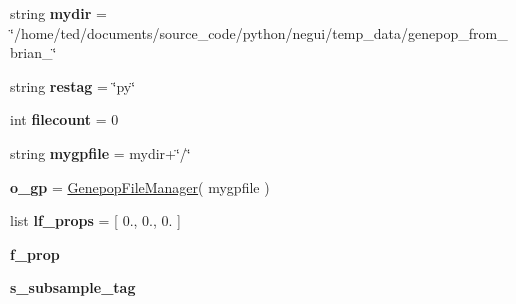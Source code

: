 \begin{DoxyCompactItemize}
\item 
string {\bfseries mydir} = \char`\"{}/home/ted/documents/source\+\_\+code/python/negui/temp\+\_\+data/genepop\+\_\+from\+\_\+brian\+\_\char`\"{}\hypertarget{namespacenegui_1_1genepopfilemanager_a44a057e40bec2bdf33e38da904cbafd1}{}\label{namespacenegui_1_1genepopfilemanager_a44a057e40bec2bdf33e38da904cbafd1}

\item 
string {\bfseries restag} = \char`\"{}py\char`\"{}\hypertarget{namespacenegui_1_1genepopfilemanager_a00d8e3e0a24bb58a0b8ef04003bf840d}{}\label{namespacenegui_1_1genepopfilemanager_a00d8e3e0a24bb58a0b8ef04003bf840d}

\item 
int {\bfseries filecount} = 0\hypertarget{namespacenegui_1_1genepopfilemanager_a6e66afe99799ede33e8e8179f0fc19e5}{}\label{namespacenegui_1_1genepopfilemanager_a6e66afe99799ede33e8e8179f0fc19e5}

\item 
string {\bfseries mygpfile} = mydir+\char`\"{}/\char`\"{}\hypertarget{namespacenegui_1_1genepopfilemanager_ab4c241637f98d6bbdc46831de4bbb52e}{}\label{namespacenegui_1_1genepopfilemanager_ab4c241637f98d6bbdc46831de4bbb52e}

\item 
{\bfseries o\+\_\+gp} = \hyperlink{classnegui_1_1genepopfilemanager_1_1GenepopFileManager}{Genepop\+File\+Manager}( mygpfile )\hypertarget{namespacenegui_1_1genepopfilemanager_a53ee7221d8bd681086430de6d2c22def}{}\label{namespacenegui_1_1genepopfilemanager_a53ee7221d8bd681086430de6d2c22def}

\item 
list {\bfseries lf\+\_\+props} = \mbox{[} 0., 0., 0. \mbox{]}\hypertarget{namespacenegui_1_1genepopfilemanager_a8586276191d2a71439e3bf4b1fb6e56b}{}\label{namespacenegui_1_1genepopfilemanager_a8586276191d2a71439e3bf4b1fb6e56b}

\item 
{\bfseries f\+\_\+prop}\hypertarget{namespacenegui_1_1genepopfilemanager_a2f4e105b886f862466457835614524eb}{}\label{namespacenegui_1_1genepopfilemanager_a2f4e105b886f862466457835614524eb}

\item 
{\bfseries s\+\_\+subsample\+\_\+tag}\hypertarget{namespacenegui_1_1genepopfilemanager_a08de653f938fa6a3dac25fb8b6a09b34}{}\label{namespacenegui_1_1genepopfilemanager_a08de653f938fa6a3dac25fb8b6a09b34}


\end{DoxyCompactItemize}
